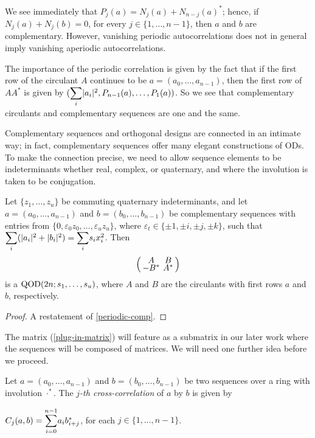 \documentclass[../../../main]{subfiles}
\begin{document}
 We see immediately that $P_j(a)=N_j(a) + N_{n-j}(a)^*$; hence, if $N_j(a)+N_j(b)=0$, for every $j \in \{1,\dots,n-1\}$, then $a$ and $b$ are complementary. However, vanishing periodic autocorrelations does not in general imply vanishing aperiodic autocorrelations.
 
 The importance of the periodic correlation is given by the fact that if the first row of the circulant $A$ continues to be $a=(a_0,\dots,a_{n-1})$, then the first row of $AA^*$ is given by $(\ssum_i|a_i|^2,P_{n-1}(a), \dots,P_1(a))$. So we see that complementary circulants and complementary sequences are one and the same.
 
 Complementary sequences and orthogonal designs are connected in an intimate way; in fact, complementary sequences offer many elegant constructions of ODs. To make the connection precise, we need to allow sequence elements to be indeterminants whether real, complex, or quaternary, and where the involution is taken to be conjugation.
 
 \begin{prop}\label{2-circs}
  Let $\{z_1,\dots,z_u\}$ be commuting quaternary indeterminants, and let $a=(a_0,\dots,a_{n-1})$ and $b=(b_0,\dots,b_{n-1})$ be complementary sequences with entries from $\{0,\varepsilon_0z_0, \dots, \varepsilon_uz_u\}$, where $\varepsilon_t \in \{\pm 1, \pm i, \pm j, \pm k\}$, such that $\ssum_i(|a_i|^2 + |b_i|^2)=\ssum_is_ix_i^2$. Then
  \begin{equation}\label{plug-in-matrix}
  \arraycolsep=2.0pt\def\arraystretch{0.5}
   \left(\begin{array}{cc}
    A&B\\-B^*&A^*
   \end{array}\right)
  \end{equation}
  is a $\text{QOD}(2n;s_1,\dots,s_u)$, where $A$ and $B$ are the circulants with first rows $a$ and $b$, respectively.
 \end{prop}
 
 \begin{proof}
  A restatement of \ref{periodic-comp}.
 \end{proof}
 
 The matrix (\ref{plug-in-matrix}) will feature as a submatrix in our later work where the sequences will be composed of matrices. We will need one further idea before we proceed. 

 \begin{defin}
  Let $a=(a_0,\dots,a_{n-1})$ and $b=(b_0,\dots,b_{n-1})$ be two sequences over a ring with involution $\cdot^*$. The {\it $j$-th cross-correlation} of $a$ by $b$ is given by
  \begin{defenum}
   \item $C_j(a,b)=\ssum_{i=0}^{n-1}a_ib_{i+j}^*$, for each $j \in \{1,\dots,n-1\}$.
  \end{defenum}
 \end{defin}
 
\end{document}
